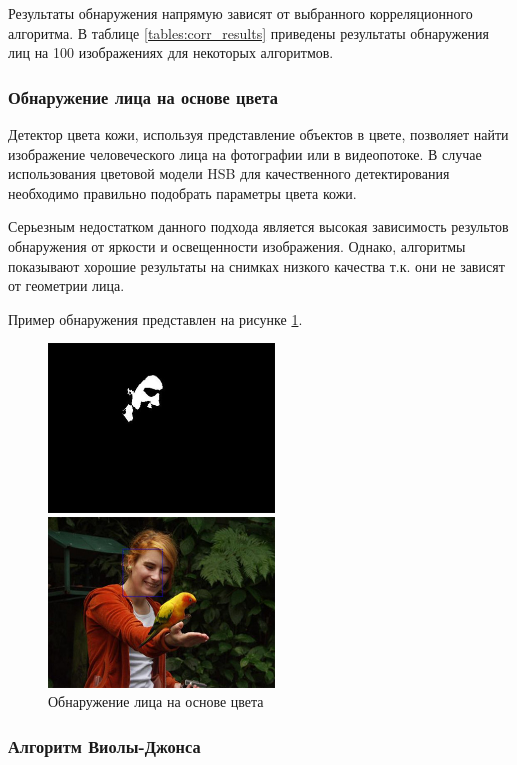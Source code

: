 Результаты обнаружения напрямую зависят от выбранного корреляционного алгоритма. В таблице \ref{tables:corr_results} приведены
результаты обнаружения лиц на 100 изображениях для некоторых алгоритмов.

\subsubsection{Обнаружение лица на основе цвета}

Детектор цвета кожи, используя представление объектов в цвете, позволяет найти изображение человеческого лица на фотографии или в
видеопотоке. В случае использования цветовой модели HSB для качественного детектирования необходимо правильно подобрать параметры
цвета кожи. 

Серьезным недостатком данного подхода является высокая зависимость результов обнаружения от яркости и освещенности изображения.
Однако, алгоритмы показывают хорошие результаты на снимках низкого качества т.к. они не зависят от геометрии лица.

Пример обнаружения представлен на рисунке \ref{fig:colors}.

\begin{figure}[hbt!]
    \centering
    \parbox{6cm}{
        \includegraphics[width=6cm]{4.jpg}
    }\qquad
    \begin{minipage}{6cm}
        \includegraphics[width=6cm]{5.jpg}
    \end{minipage}
    \caption{Обнаружение лица на основе цвета}
    \label{fig:colors}
\end{figure}

\subsubsection{Алгоритм Виолы-Джонса}

